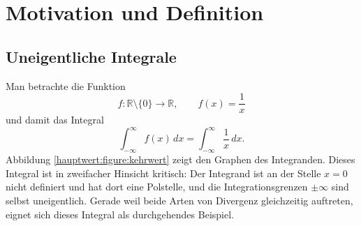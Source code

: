 %
%
%
%
\section{Motivation und Definition
\label{hauptwert:section:motivation-definition}}
\subsection{Uneigentliche Integrale}


Man betrachte die Funktion
\begin{equation}
f\colon \mathbb{R}\setminus\{0\} \to \mathbb{R},
\qquad
f(x) = \frac{1}{x}
\end{equation}
und damit das Integral
\begin{equation}
\int_{-\infty}^{\infty} f(x)\,dx
= \int_{-\infty}^{\infty} \frac{1}{x}\,dx.
\end{equation}
Abbildung \ref{hauptwert:figure:kehrwert} zeigt den Graphen des Integranden.
Dieses Integral ist in zweifacher Hinsicht kritisch:
Der Integrand ist an der Stelle $x = 0$ nicht definiert
und hat dort eine Polstelle,
und die Integrationsgrenzen $\pm\infty$ sind selbst uneigentlich.
Gerade weil beide Arten von Divergenz gleichzeitig auftreten,
eignet sich dieses Integral als durchgehendes Beispiel.

